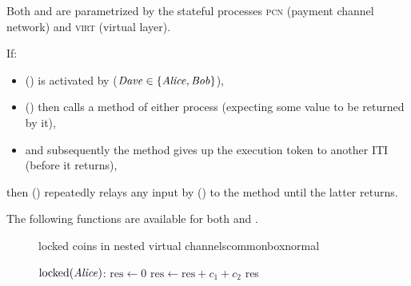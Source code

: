 Both \pchan and \fchan are parametrized by the stateful processes \textsc{pcn}
(payment channel network) and \textsc{virt} (virtual layer).

If:
\begin{itemize}
  \item \pchan (\fchan) is activated by \environment ($\mathit{Dave} \in \{\mathit{Alice},
  \mathit{Bob}\}$),
  \item \pchan (\fchan) then calls a method of either process (expecting some
  value to be returned by it),
  \item and subsequently the method gives up the execution token to another ITI
  (before it returns),
\end{itemize}
then \pchan (\fchan) repeatedly relays any input by \environment (\dave) to the
method until the latter returns.

The following functions are available for both \pchan and \fchan.
\begin{figure}[H]
  \begin{titlebox}{\normalfont locked coins in nested virtual
  channels}{commonbox}{normal}
    \begin{algorithmic}[1]
      \State $\mathrm{locked}(\mathit{Alice})$:
      \Indent
        \State $\mathrm{res} \gets 0$
          \State $\mathrm{res} \gets \mathrm{res} + c_1 + c_2$
        \EndFor
        \State \Return res
      \EndIndent
    \end{algorithmic}
  \end{titlebox}
  \caption{}
  \label{code:locked}
\end{figure}
